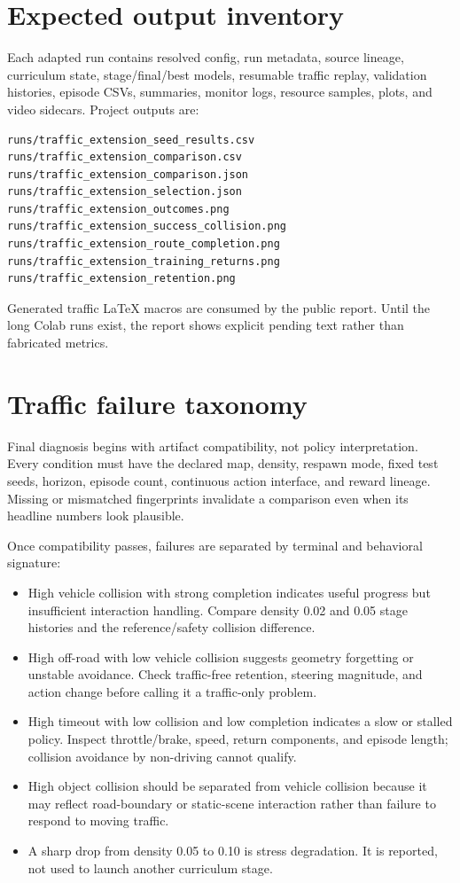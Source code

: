 \documentclass[10pt,twocolumn]{article}
\begin{document}
\section{Expected output inventory}
Each adapted run contains resolved config, run metadata, source lineage, curriculum
state, stage/final/best models, resumable traffic replay, validation histories, episode
CSVs, summaries, monitor logs, resource samples, plots, and video sidecars. Project
outputs are:
\begin{Verbatim}[fontsize=\scriptsize,breaklines=true,breakanywhere=true]
runs/traffic_extension_seed_results.csv
runs/traffic_extension_comparison.csv
runs/traffic_extension_comparison.json
runs/traffic_extension_selection.json
runs/traffic_extension_outcomes.png
runs/traffic_extension_success_collision.png
runs/traffic_extension_route_completion.png
runs/traffic_extension_training_returns.png
runs/traffic_extension_retention.png
\end{Verbatim}
Generated traffic LaTeX macros are consumed by the public report. Until the long Colab
runs exist, the report shows explicit pending text rather than fabricated metrics.

\section{Traffic failure taxonomy}
Final diagnosis begins with artifact compatibility, not policy interpretation. Every
condition must have the declared map, density, respawn mode, fixed test seeds, horizon,
episode count, continuous action interface, and reward lineage. Missing or mismatched
fingerprints invalidate a comparison even when its headline numbers look plausible.

Once compatibility passes, failures are separated by terminal and behavioral signature:
\begin{itemize}
\item High vehicle collision with strong completion indicates useful progress but
insufficient interaction handling. Compare density 0.02 and 0.05 stage histories and the
reference/safety collision difference.
\item High off-road with low vehicle collision suggests geometry forgetting or unstable
avoidance. Check traffic-free retention, steering magnitude, and action change before
calling it a traffic-only problem.
\item High timeout with low collision and low completion indicates a slow or stalled
policy. Inspect throttle/brake, speed, return components, and episode length; collision
avoidance by non-driving cannot qualify.
\item High object collision should be separated from vehicle collision because it may
reflect road-boundary or static-scene interaction rather than failure to respond to
moving traffic.
\item A sharp drop from density 0.05 to 0.10 is stress degradation. It is reported, not
used to launch another curriculum stage.
\end{itemize}
\end{document}

